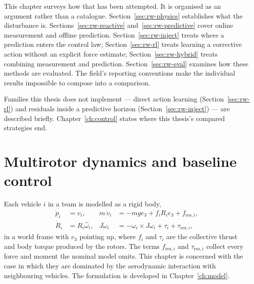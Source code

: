 This chapter surveys how that has been attempted. It is organised as an argument rather than a
catalogue. Section~\ref{sec:rw-physics} establishes what the disturbance is.
Sections~\ref{sec:rw-reactive} and~\ref{sec:rw-predictive} cover online measurement and offline
prediction. Section~\ref{sec:rw-inject} treats where a prediction enters the control law;
Section~\ref{sec:rw-rl} treats learning a corrective action without an explicit force estimate;
Section~\ref{sec:rw-hybrid} treats combining measurement and prediction.
Section~\ref{sec:rw-eval} examines how these methods are evaluated. The field's reporting
conventions make the individual results impossible to compose into a comparison.

Families this thesis does not implement --- direct action learning (Section~\ref{sec:rw-rl}) and
residuals inside a predictive horizon (Section~\ref{sec:rw-inject}) --- are described briefly.
Chapter~\ref{ch:control} states where this thesis's compared strategies end.

\section{Multirotor dynamics and baseline control}
\label{sec:rw-baseline}

Each vehicle $i$ in a team is modelled as a rigid body,
%
\begin{align}
  \dot{p}_i &= v_i, &
  m\,\dot{v}_i &= -m g e_3 + f_i R_i e_3 + f_{\mathrm{res},i}, \label{eq:rw-trans}\\
  \dot{R}_i &= R_i \hat{\omega}_i, &
  J\dot{\omega}_i &= -\omega_i \times J\omega_i + \tau_i + \tau_{\mathrm{res},i},
  \label{eq:rw-rot}
\end{align}
%
in a world frame with $e_3$ pointing up, where $f_i$ and $\tau_i$ are the collective thrust and
body torque produced by the rotors. The
terms $f_{\mathrm{res},i}$ and $\tau_{\mathrm{res},i}$ collect every force and moment the nominal
model omits. This chapter is concerned with the case in which they are dominated by the
aerodynamic interaction with neighbouring vehicles. The formulation is developed in
Chapter~\ref{ch:model}.

